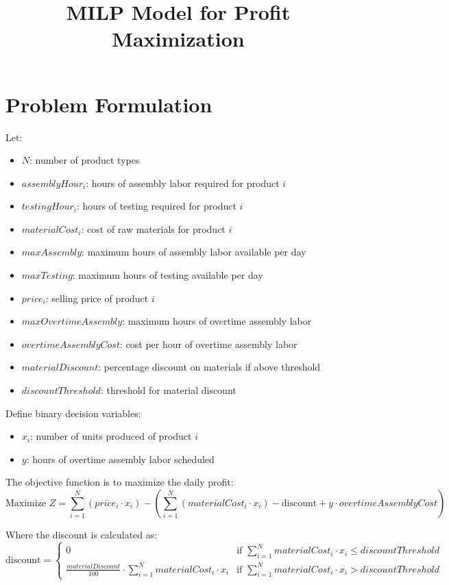\documentclass{article}
\begin{document}
\title{MILP Model for Profit Maximization}
\author{}
\date{}
\maketitle

\section*{Problem Formulation}

Let:
\begin{itemize}
    \item \( N \): number of product types
    \item \( assemblyHour_i \): hours of assembly labor required for product \( i \)
    \item \( testingHour_i \): hours of testing required for product \( i \)
    \item \( materialCost_i \): cost of raw materials for product \( i \)
    \item \( maxAssembly \): maximum hours of assembly labor available per day
    \item \( maxTesting \): maximum hours of testing available per day
    \item \( price_i \): selling price of product \( i \)
    \item \( maxOvertimeAssembly \): maximum hours of overtime assembly labor
    \item \( overtimeAssemblyCost \): cost per hour of overtime assembly labor
    \item \( materialDiscount \): percentage discount on materials if above threshold
    \item \( discountThreshold \): threshold for material discount
\end{itemize}

Define binary decision variables:
\begin{itemize}
    \item \( x_i \): number of units produced of product \( i \)
    \item \( y \): hours of overtime assembly labor scheduled
\end{itemize}

The objective function is to maximize the daily profit:
\[
\text{Maximize } Z = \sum_{i=1}^{N} (price_i \cdot x_i) - \left( \sum_{i=1}^{N} (materialCost_i \cdot x_i) - \text{discount} + y \cdot overtimeAssemblyCost \right)
\]

Where the discount is calculated as:
\[
\text{discount} = 
\begin{cases}
0 & \text{if } \sum_{i=1}^{N} materialCost_i \cdot x_i \leq discountThreshold \\
\frac{materialDiscount}{100} \cdot \sum_{i=1}^{N} materialCost_i \cdot x_i & \text{if } \sum_{i=1}^{N} materialCost_i \cdot x_i > discountThreshold
\end{cases}
\]
\end{document}
